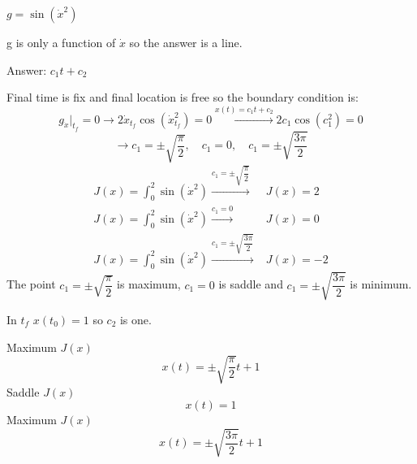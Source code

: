 $g = \sin(\dot x^2)$


g is only a function of $\dot x$ so the answer is a line.



Answer: $c_1t+c_2$


Final time is fix and final location is free so the boundary condition is:
$$g_{\dot x} \vert_{t_f} = 0 \to 2\dot x_{t_f}\cos(\dot x_{t_f}^2) = 0\xrightarrow{x(t) = c_1t+c_2}2c_1\cos(c_1^2) = 0$$
$$\to c_1 = \pm \sqrt{\dfrac{\pi}{2}}, \quad c_1 = 0 ,\quad c_1 = \pm \sqrt{\dfrac{3\pi}{2}}$$
\begin{align}
J(x) = \int_0^2 \sin(\dot x^2)  \xrightarrow{c_1 =\pm  \sqrt{\dfrac{\pi}{2}}}  &J(x) = 2\\
J(x) = \int_0^2 \sin(\dot x^2)  \xrightarrow{c_1 = 0 } &J(x) = 0\\
J(x) = \int_0^2 \sin(\dot x^2)  \xrightarrow{c_1 =\pm  \sqrt{\dfrac{3\pi}{2}}}  &J(x) = -2
\end{align}
The point $c_1 =\pm  \sqrt{\dfrac{\pi}{2}} $ is maximum, $c_1 =0$ is saddle and $c_1 =\pm  \sqrt{\dfrac{3\pi}{2}} $ is minimum.
﻿﻿


In $t_f$ $x(t_0) = 1$ so $c_2$ is one.


Maximum $J(x)$
$$x(t) = \pm \sqrt{\dfrac{\pi}{2}}t + 1$$
Saddle $J(x)$
$$x(t) = 1$$
Maximum $J(x)$
$$x(t) = \pm \sqrt{\dfrac{3\pi}{2}}t + 1$$